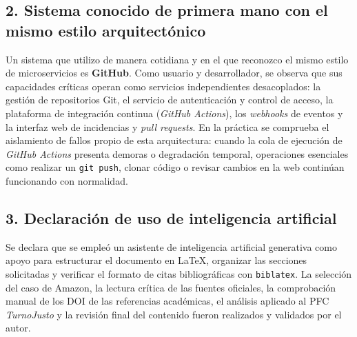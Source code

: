\documentclass[10pt,letterpaper]{article}
\begin{document}
\subsection*{2. Sistema conocido de primera mano con el mismo estilo arquitectónico}
Un sistema que utilizo de manera cotidiana y en el que reconozco el mismo estilo de microservicios es \textbf{GitHub}. Como usuario y desarrollador, se observa que sus capacidades críticas operan como servicios independientes desacoplados: la gestión de repositorios Git, el servicio de autenticación y control de acceso, la plataforma de integración continua (\emph{GitHub Actions}), los \emph{webhooks} de eventos y la interfaz web de incidencias y \emph{pull requests}. En la práctica se comprueba el aislamiento de fallos propio de esta arquitectura: cuando la cola de ejecución de \emph{GitHub Actions} presenta demoras o degradación temporal, operaciones esenciales como realizar un \texttt{git push}, clonar código o revisar cambios en la web continúan funcionando con normalidad.

\subsection*{3. Declaración de uso de inteligencia artificial}
Se declara que se empleó un asistente de inteligencia artificial generativa como apoyo para estructurar el documento en \LaTeX, organizar las secciones solicitadas y verificar el formato de citas bibliográficas con \texttt{biblatex}. La selección del caso de Amazon, la lectura crítica de las fuentes oficiales, la comprobación manual de los DOI de las referencias académicas, el análisis aplicado al PFC \emph{TurnoJusto} y la revisión final del contenido fueron realizados y validados por el autor.

\clearpage

\printbibliography[title={Referencias}]
\end{document}

